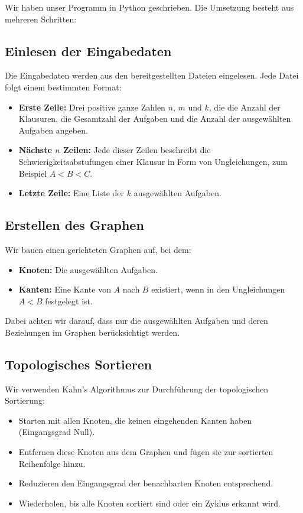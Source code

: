 \documentclass{article}
\begin{document}
Wir haben unser Programm in Python geschrieben. Die Umsetzung besteht aus mehreren Schritten:

\subsection{Einlesen der Eingabedaten}

Die Eingabedaten werden aus den bereitgestellten Dateien eingelesen. Jede Datei folgt einem bestimmten Format:

\begin{itemize}
    \item \textbf{Erste Zeile:} Drei positive ganze Zahlen \( n \), \( m \) und \( k \), die die Anzahl der Klausuren, die Gesamtzahl der Aufgaben und die Anzahl der ausgewählten Aufgaben angeben.
    \item \textbf{Nächste \( n \) Zeilen:} Jede dieser Zeilen beschreibt die Schwierigkeitsabstufungen einer Klausur in Form von Ungleichungen, zum Beispiel \( A < B < C \).
    \item \textbf{Letzte Zeile:} Eine Liste der \( k \) ausgewählten Aufgaben.
\end{itemize}

\subsection{Erstellen des Graphen}

Wir bauen einen gerichteten Graphen auf, bei dem:

\begin{itemize}
    \item \textbf{Knoten:} Die ausgewählten Aufgaben.
    \item \textbf{Kanten:} Eine Kante von \( A \) nach \( B \) existiert, wenn in den Ungleichungen \( A < B \) festgelegt ist.
\end{itemize}

Dabei achten wir darauf, dass nur die ausgewählten Aufgaben und deren Beziehungen im Graphen berücksichtigt werden.

\subsection{Topologisches Sortieren}

Wir verwenden Kahn's Algorithmus zur Durchführung der topologischen Sortierung:

\begin{itemize}
    \item Starten mit allen Knoten, die keinen eingehenden Kanten haben (Eingangsgrad Null).
    \item Entfernen diese Knoten aus dem Graphen und fügen sie zur sortierten Reihenfolge hinzu.
    \item Reduzieren den Eingangsgrad der benachbarten Knoten entsprechend.
    \item Wiederholen, bis alle Knoten sortiert sind oder ein Zyklus erkannt wird.
\end{itemize}
\end{document}
